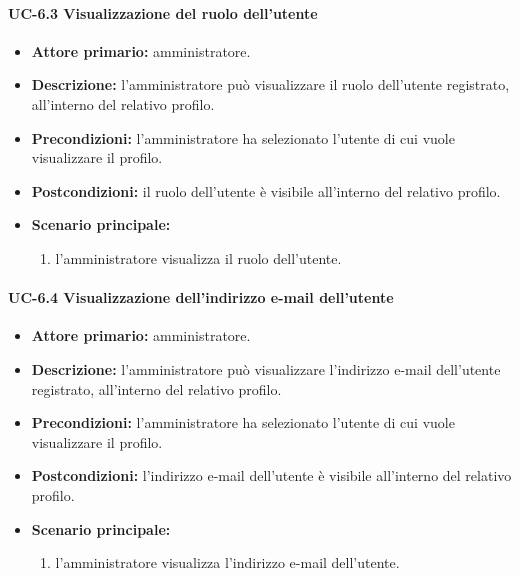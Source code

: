     \paragraph{UC-6.3 Visualizzazione del ruolo dell'utente}
    \begin{itemize}
        \item \textbf{Attore primario:} amministratore.
        
        \item \textbf{Descrizione:} l'amministratore può visualizzare il ruolo dell'utente registrato, all'interno del relativo profilo.
        
        \item \textbf{Precondizioni:} l'amministratore ha selezionato l'utente di cui vuole visualizzare il profilo.
    
        \item \textbf{Postcondizioni:} il ruolo dell'utente è visibile all'interno del relativo profilo.
    
        \item \textbf{Scenario principale:}
        \begin{enumerate}
            \item  l'amministratore visualizza il ruolo dell'utente.
        \end{enumerate}
    \end{itemize}

    \paragraph{UC-6.4 Visualizzazione dell'indirizzo e-mail dell'utente}
    \begin{itemize}
        \item \textbf{Attore primario:} amministratore.
        
        \item \textbf{Descrizione:} l'amministratore può visualizzare l'indirizzo e-mail dell'utente registrato, all'interno del relativo profilo.
        
        \item \textbf{Precondizioni:} l'amministratore ha selezionato l'utente di cui vuole visualizzare il profilo.
    
        \item \textbf{Postcondizioni:} l'indirizzo e-mail dell'utente è visibile all'interno del relativo profilo.
    
        \item \textbf{Scenario principale:}
        \begin{enumerate}
            \item  l'amministratore visualizza l'indirizzo e-mail dell'utente.
        \end{enumerate}
    \end{itemize}
    
